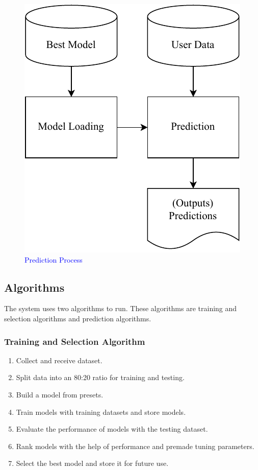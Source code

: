 \documentclass[a4paper,fleqn]{cas-dc}
\newcommand{\responsemodsm}[1]{\textcolor{blue}{#1}}
\newcommand{\captionb}[1]{\caption{\responsemodsm{#1}}}
\begin{document}
\begin{figure}[ht]
    \centering
    \includegraphics[width=0.7\columnwidth]{prediction.pdf}
    \captionb{Prediction Process}
    \label{fig:prediction_process}
\end{figure}

\subsection{Algorithms}\label{subsec:algorithms}

The system uses two algorithms to run. These algorithms are training and selection algorithms and prediction algorithms.

\vspace{-0.5em}
\subsubsection*{Training and Selection Algorithm}\label{subsubsec:training_and_selection_algorithm}
\vspace{0.5em}
\begin{enumerate}
    \item Collect and receive dataset.
    \item Split data into an 80:20 ratio for training and testing.
    \item Build a model from presets.
    \item Train models with training datasets and store models.
    \item Evaluate the performance of models with the testing dataset.
    \item Rank models with the help of performance and premade tuning parameters.
    \item Select the best model and store it for future use.
\end{enumerate}
\end{document}
